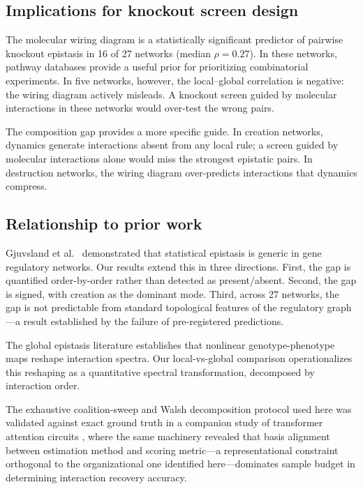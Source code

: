 \documentclass[11pt]{article}
\begin{document}
\subsection{Implications for knockout screen design}

The molecular wiring diagram is a statistically significant predictor
of pairwise knockout epistasis in 16 of 27 networks (median
$\rho = 0.27$). In these networks, pathway databases provide a
useful prior for prioritizing combinatorial experiments. In five
networks, however, the local--global correlation is negative: the
wiring diagram actively misleads. A knockout screen guided by
molecular interactions in these networks would over-test the
wrong pairs.

The composition gap provides a more specific guide. In creation
networks, dynamics generate interactions absent from any local rule;
a screen guided by molecular interactions alone would miss the
strongest epistatic pairs. In destruction networks, the wiring diagram
over-predicts interactions that dynamics compress.

\subsection{Relationship to prior work}

Gjuvsland et al.\ \citep{gjuvsland2007statistical} demonstrated that
statistical epistasis is generic in gene regulatory networks. Our
results extend this in three directions. First, the gap is quantified
order-by-order rather than detected as present/absent. Second, the
gap is signed, with creation as the dominant mode. Third, across 27
networks, the gap is not predictable from standard topological
features of the regulatory graph---a result established by the
failure of pre-registered predictions.

The global epistasis literature \citep{otwinowski2018inferring, reddy2021global} establishes that nonlinear genotype-phenotype maps
reshape interaction spectra. Our local-vs-global comparison
operationalizes this reshaping as a quantitative spectral
transformation, decomposed by interaction order.

The exhaustive coalition-sweep and Walsh decomposition protocol used
here was validated against exact ground truth in a companion study
of transformer attention circuits \citep{tower2026epistasis}, where the same machinery revealed that basis alignment
between estimation method and scoring metric---a representational
constraint orthogonal to the organizational one identified
here---dominates sample budget in determining interaction recovery
accuracy.
\end{document}
